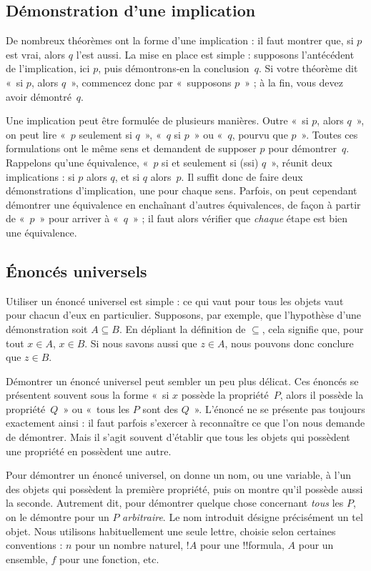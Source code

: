 \documentclass[../../../include/open-logic-section]{subfiles}
\begin{document}
\subsection{Démonstration d'une implication}

De nombreux théorèmes ont la forme d'une implication : il faut
montrer que, si $p$ est vrai, alors $q$ l'est aussi. La mise en
place est simple : supposons l'antécédent de l'implication, ici
$p$, puis démontrons-en la conclusion~$q$. Si votre théorème dit
«~si $p$, alors $q$~», commencez donc par «~supposons $p$~» ;
à la fin, vous devez avoir démontré~$q$.

Une implication peut être formulée de plusieurs manières.
Outre «~si $p$, alors $q$~», on peut lire «~$p$ seulement si
$q$~», «~$q$ si $p$~» ou «~$q$, pourvu que $p$~». Toutes ces
formulations ont le même sens et demandent de supposer $p$
pour démontrer~$q$. Rappelons qu'une équivalence, «~$p$ si et
seulement si (ssi) $q$~», réunit deux implications : si $p$
alors $q$, et si $q$ alors~$p$. Il suffit donc de faire deux
démonstrations d'implication, une pour chaque sens. Parfois,
on peut cependant démontrer une équivalence en enchaînant
d'autres équivalences, de façon à partir de «~$p$~» pour
arriver à «~$q$~» ; il faut alors vérifier que \emph{chaque}
étape est bien une équivalence.

\subsection{Énoncés universels}

Utiliser un énoncé universel est simple : ce qui vaut pour
tous les objets vaut pour chacun d'eux en particulier.
Supposons, par exemple, que l'hypothèse d'une démonstration
soit $A \subseteq B$. En dépliant la définition de
$\subseteq$, cela signifie que, pour tout $x \in A$,
$x \in B$. Si nous savons aussi que $z \in A$, nous
pouvons donc conclure que $z \in B$.

Démontrer un énoncé universel peut sembler un peu plus délicat.
Ces énoncés se présentent souvent sous la forme «~si $x$
possède la propriété~$P$, alors il possède la propriété~$Q$~»
ou «~tous les $P$ sont des $Q$~». L'énoncé ne se présente
pas toujours exactement ainsi : il faut parfois s'exercer
à reconnaître ce que l'on nous demande de démontrer. Mais
il s'agit souvent d'établir que tous les objets qui possèdent
une propriété en possèdent une autre.

Pour démontrer un énoncé universel, on donne un nom, ou une
variable, à l'un des objets qui possèdent la première
propriété, puis on montre qu'il possède aussi la seconde.
Autrement dit, pour démontrer quelque chose concernant
\emph{tous} les $P$, on le démontre pour un $P$
\emph{arbitraire}. Le nom introduit désigne précisément
un tel objet. Nous utilisons habituellement une seule
lettre, choisie selon certaines conventions : $n$ pour
un nombre naturel, $!A$ pour une !!{formula}, $A$ pour
un ensemble, $f$ pour une fonction, etc.
\end{document}
